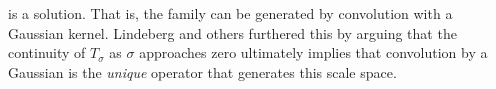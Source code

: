     is a solution.  That is, the family can be generated by convolution with a Gaussian kernel. Lindeberg and others furthered this by arguing that the continuity of $T_\sigma$ as $\sigma$ approaches zero ultimately implies that convolution by a Gaussian is the \textit{unique} operator that generates this scale space. 
%    
%    
%    
%    
%    
%
